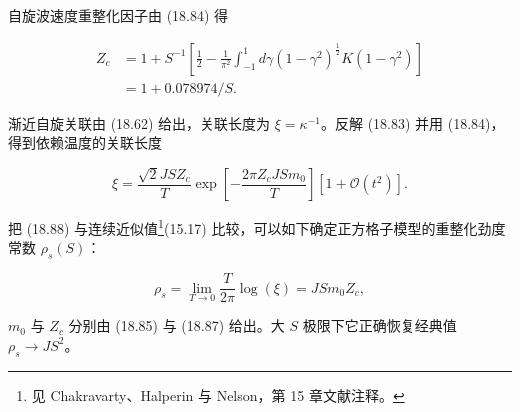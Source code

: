 自旋波速度重整化因子由 (18.84) 得

\begin{align*}
Z _ {c} & = 1 + S ^ {- 1} \left[ \frac {1}{2} - \frac {1}{\pi^ {2}} \int_ {- 1} ^ {1} d \gamma \left( 1 - \gamma^ {2} \right) ^ {\frac {1}{2}} K \left( 1 - \gamma^ {2} \right) \right]\\
& = 1 + 0.078974 / S .
\tag{18.87}
\end{align*}

渐近自旋关联由 (18.62) 给出，关联长度为 $\xi = \kappa^{-1}$。反解 (18.83) 并用 (18.84)，得到依赖温度的关联长度

\begin{equation*}
\xi = \frac {\sqrt {2} J S Z _ {c}}{T} \exp \left[ - \frac {2 \pi Z _ {c} J S m _ {0}}{T} \right] \left[ 1 + \mathcal {O} ( t ^ {2} ) \right].
\tag{18.88}
\end{equation*}

把 (18.88) 与连续近似值\footnote{见 Chakravarty、Halperin 与 Nelson，第 15 章文献注释。}(15.17) 比较，可以如下确定正方格子模型的重整化劲度常数 $\rho_{s}(S)$：

\begin{equation*}
\rho_ {s} = \lim_{T \to 0} \frac {T}{2 \pi} \log ( \xi ) = J S m _ {0} Z _ {c} ,
\tag{18.89}
\end{equation*}

$m_{0}$ 与 $Z_{c}$ 分别由 (18.85) 与 (18.87) 给出。大 $S$ 极限下它正确恢复经典值 $\rho_{s} \rightarrow JS^{2}$。

